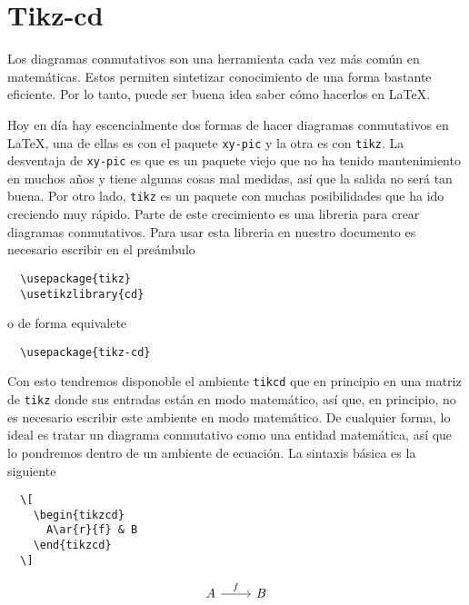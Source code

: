 
\chapter{Tikz-cd}
Los diagramas conmutativos son una herramienta cada vez más común en matemáticas. Estos permiten sintetizar conocimiento de una forma bastante eficiente. Por lo tanto, puede ser buena idea saber cómo hacerlos en \LaTeX.

Hoy en día hay escencialmente dos formas de hacer diagramas conmutativos en \LaTeX, una de ellas es con el paquete \texttt{xy-pic} y la otra es con
\texttt{tikz}. La desventaja de \texttt{xy-pic} es que es un paquete viejo que no ha tenido mantenimiento en muchos años y tiene algunas cosas mal medidas,
así que la salida no será tan buena. Por otro lado, \texttt{tikz} es un paquete con muchas posibilidades que ha ido creciendo muy rápido. Parte de este
crecimiento es una libreria para crear diagramas conmutativos. Para usar esta libreria en nuestro documento es necesario escribir en el preámbulo
\begin{verbatim}
  \usepackage{tikz}
  \usetikzlibrary{cd}
\end{verbatim}
o de forma equivalete
\begin{verbatim}
  \usepackage{tikz-cd}
\end{verbatim}

Con esto tendremos disponoble el ambiente \texttt{tikcd} que en principio en una matriz de \texttt{tikz} donde sus entradas están en modo matemático, así
que, en principio, no es necesario escribir este ambiente en modo matemático. De cualquier forma, lo ideal es tratar un diagrama conmutativo como una entidad
matemática, así que lo pondremos dentro de un ambiente de ecuación. La sintaxis básica es la siguiente

\begin{minipage}{0.4\linewidth}
\begin{verbatim}
  \[
    \begin{tikzcd}
      A\ar{r}{f} & B
    \end{tikzcd}
  \]
\end{verbatim}
\end{minipage}%
\begin{minipage}{0.5\linewidth}
  \[
    \begin{tikzcd}
      A\ar{r}{f} & B
    \end{tikzcd}
  \]
\end{minipage}

